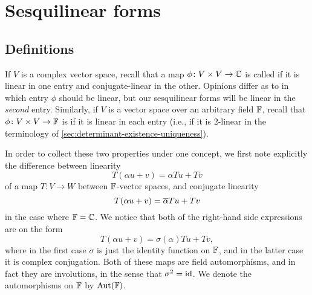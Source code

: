 \chapter{Sesquilinear forms}\label{ch:sesquilinear-forms}

\section{Definitions}

If $V$ is a complex vector space, recall that a map $\phi \colon V \prod V \to \complex$ is called  if it is linear in one entry and conjugate-linear in the other. Opinions differ as to in which entry $\phi$ should be linear, but our sesquilinear forms will be linear in the \emph{second} entry. Similarly, if $V$ is a vector space over an arbitrary field $\mathbb{F}$, recall that $\phi \colon V \prod V \to \fieldF$ is  if it is linear in each entry (i.e., if it is $2$-linear in the terminology of \cref{sec:determinant-existence-uniqueness}).

In order to collect these two properties under one concept, we first note explicitly the difference between linearity
%
\begin{equation*}
    T(\alpha u + v)
        = \alpha Tu + Tv
\end{equation*}
%
of a map $T \colon V \to W$ between $\mathbb{F}$-vector spaces, and conjugate linearity
%
\begin{equation*}
    T(\alpha u + v)
        = \overline{\alpha} Tu + Tv
\end{equation*}
%
in the case where $\mathbb{F} = \mathbb{C}$. We notice that both of the right-hand side expressions are on the form
%
\begin{equation*}
    T(\alpha u + v)
        = \sigma(\alpha) Tu + Tv,
\end{equation*}
%
where in the first case $\sigma$ is just the identity function on $\mathbb{F}$, and in the latter case it is complex conjugation. Both of these maps are field automorphisms, and in fact they are involutions, in the sense that $\sigma^2 = \operatorname{id}$. We denote the automorphisms on $\mathbb{F}$ by $\mathrm{Aut}(\mathbb{F})$.

